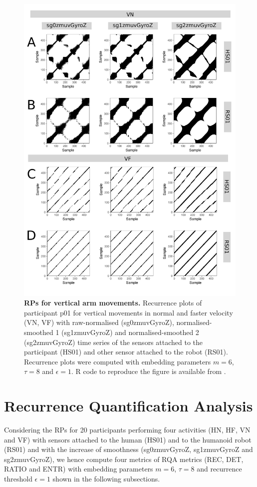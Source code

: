 \begin{figure}[!h]
\centering
\includegraphics[height=0.85\textheight]{rp_aV}
\caption{
	{\bf RPs for vertical arm movements.}	
	Recurrence plots %
	of participant p01 for vertical movements in normal and faster 
	velocity (VN, VF) with raw-normalised (sg0zmuvGyroZ), 
	normalised-smoothed 1 (sg1zmuvGyroZ) and 
	normalised-smoothed 2 (sg2zmuvGyroZ) time series of the 
	sensors attached to the participant (HS01) and other sensor 
	attached to the robot (RS01).
	Recurrence plots were computed with 
	embedding parameters $m=6$, $\tau=8$ and $\epsilon=1$.
	R code to reproduce the figure is available from \cite{hwum2018}.
        }
    \label{fig:rp_aV}
\end{figure}




\section{Recurrence Quantification Analysis}
Considering the RPs for 20 participants performing four activities 
(HN, HF, VN and VF) with sensors attached to the human (HS01) and to the 
humanoid robot (RS01) and with the increase of smoothness 
(sg0zmuvGyroZ, sg1zmuvGyroZ and sg2zmuvGyroZ), 
we hence compute four metrics of RQA metrics (REC, DET, RATIO and ENTR) with 
embedding parameters $m=6$, $\tau=8$ and recurrence threshold $\epsilon=1$ 
shown in the following subsections.

